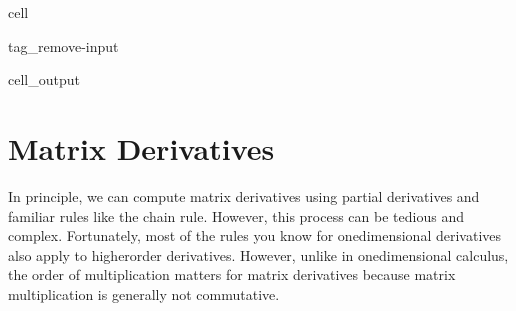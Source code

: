\documentclass[letterpaper,10pt,english]{jupyterBook}
\begin{document}
\begin{sphinxuseclass}{cell}
\begin{sphinxuseclass}{tag_remove-input}\begin{sphinxVerbatimOutput}

\begin{sphinxuseclass}{cell_output}
\noindent{}

\end{sphinxuseclass}\end{sphinxVerbatimOutput}

\end{sphinxuseclass}
\end{sphinxuseclass}
\sphinxstepscope


\section{Matrix Derivatives}
\label{\detokenize{optimization_gradients:matrix-derivatives}}\label{\detokenize{optimization_gradients::doc}}
\sphinxAtStartPar
In principle, we can compute matrix derivatives using partial derivatives and familiar rules like the chain rule. However, this process can be tedious and complex. Fortunately, most of the rules you know for one\sphinxhyphen{}dimensional derivatives also apply to higher\sphinxhyphen{}order derivatives. However, unlike in one\sphinxhyphen{}dimensional calculus, the order of multiplication matters for matrix derivatives because matrix multiplication is generally not commutative.
\end{document}
